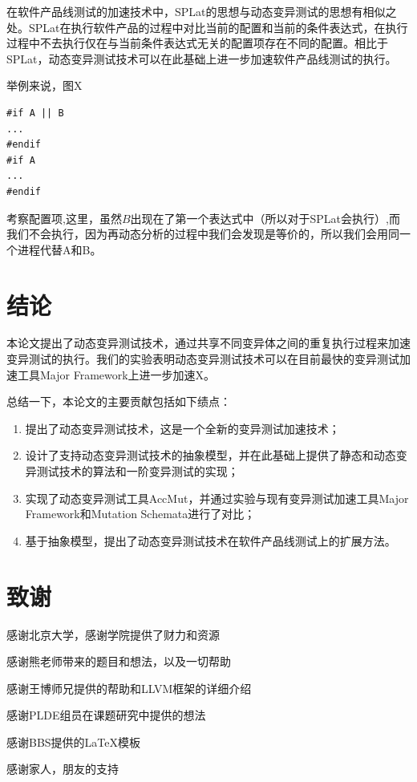 \documentclass[nofonts]{ctexrep}
\begin{document}
在软件产品线测试的加速技术中，SPLat的思想与动态变异测试的思想有相似之处。SPLat在执行软件产品的过程中对比当前的配置和当前的条件表达式，在执行过程中不去执行仅在与当前条件表达式无关的配置项存在不同的配置。相比于SPLat，动态变异测试技术可以在此基础上进一步加速软件产品线测试的执行。

举例来说，图X

\begin{verbatim}
#if A || B
...
#endif
#if A 
...
#endif
\end{verbatim}

考察配置项,这里，虽然$B$出现在了第一个表达式中（所以对于SPLat会执行）,而我们不会执行，因为再动态分析的过程中我们会发现是等价的，所以我们会用同一个进程代替A和B。


\chapter{结论}
本论文提出了动态变异测试技术，通过共享不同变异体之间的重复执行过程来加速变异测试的执行。我们的实验表明动态变异测试技术可以在目前最快的变异测试加速工具Major Framework上进一步加速X。

总结一下，本论文的主要贡献包括如下绩点：
\begin{enumerate}
\item
提出了动态变异测试技术，这是一个全新的变异测试加速技术；
\item
设计了支持动态变异测试技术的抽象模型，并在此基础上提供了静态和动态变异测试技术的算法和一阶变异测试的实现；
\item
实现了动态变异测试工具AccMut，并通过实验与现有变异测试加速工具Major Framework和Mutation Schemata进行了对比；
\item
基于抽象模型，提出了动态变异测试技术在软件产品线测试上的扩展方法。
\end{enumerate}




\chapter*{致谢}
感谢北京大学，感谢学院提供了财力和资源

感谢熊老师带来的题目和想法，以及一切帮助

感谢王博师兄提供的帮助和LLVM框架的详细介绍

感谢PLDE组员在课题研究中提供的想法

感谢BBS提供的LaTeX模板

感谢家人，朋友的支持
\end{document}
